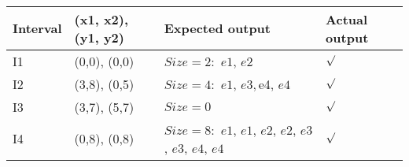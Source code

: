 \\ \\ \\
\begin{tabular}{ p{1.5cm} | p{3cm} | p{4cm} | p{1.5cm} }
	Interval & (x1, x2), (y1, y2) & Expected output & Actual output \\
	\hline
	I1 & (0,0), (0,0) & $Size = 2:$ \newline $e1$, $e2$ & $\surd$ \\
	I2 & (3,8), (0,5) & $Size = 4:$ \newline $e1$, $e3, $e4, $e4$ & $\surd$ \\
	I3 & (3,7), (5,7) & $Size = 0$ & $\surd$ \\
	I4 & (0,8), (0,8) & $Size = 8:$ \newline $e1$, $e1$, $e2$, $e2$, $e3$, $e3$, $e4$, $e4$ & $\surd$
\end{tabular}